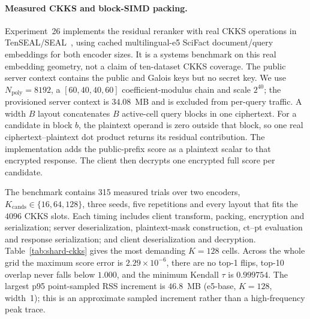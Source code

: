 \paragraph{Measured CKKS and block-SIMD packing.}\label{ssec:shard-ckks}
Experiment~26 implements the residual reranker with real CKKS operations in
TenSEAL/SEAL~\cite{ref_tenseal}, using cached multilingual-e5 SciFact
document/query embeddings for both encoder sizes. It is a systems benchmark
on this real embedding geometry, not a claim of ten-dataset CKKS coverage.
The public server context contains the public and Galois keys but no secret
key. We use $N_{\mathrm{poly}}=8192$, a
$[60,40,40,60]$ coefficient-modulus chain and scale $2^{40}$; the provisioned
server context is $34.08$~MB and is excluded from per-query traffic. A width
$B$ layout concatenates $B$ active-cell query blocks in one ciphertext. For a
candidate in block $b$, the plaintext operand is zero outside that block, so
one real ciphertext--plaintext dot product returns its residual contribution.
The implementation adds the public-prefix score as a plaintext scalar to that
encrypted response. The client then decrypts one encrypted full score per
candidate.

The benchmark contains 315 measured trials over two encoders,
$K_{\mathrm{cands}}\in\{16,64,128\}$, three seeds, five repetitions and every
layout that fits the $4096$ CKKS slots. Each timing includes client transform,
packing, encryption and serialization; server deserialization, plaintext-mask
construction, ct--pt evaluation and response serialization; and client
deserialization and decryption. Table~\ref{tab:shard-ckks} gives the most
demanding $K=128$ cells. Across the whole grid the maximum score error is
$2.29\times10^{-6}$, there are no top-1 flips, top-10 overlap never falls below
$1.000$, and the minimum Kendall $\tau$ is $0.999754$. The largest p95
point-sampled RSS increment is $46.8$~MB (e5-base, $K=128$, width~1); this is
an approximate sampled increment rather than a high-frequency peak trace.

